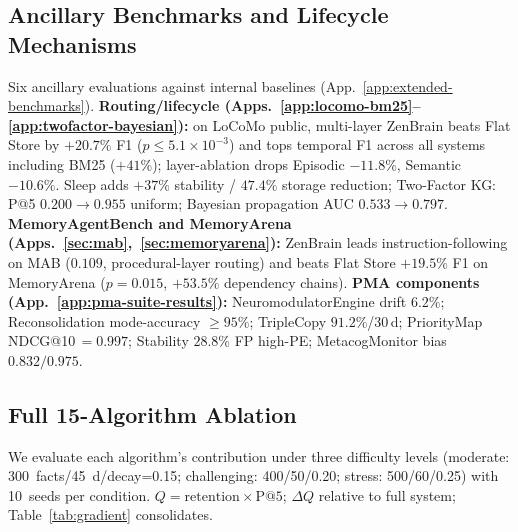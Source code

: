 \documentclass{article}
\begin{document}
\subsection{Ancillary Benchmarks and Lifecycle Mechanisms}
\label{sec:ancillary}

Six ancillary evaluations against internal baselines
(App.~\ref{app:extended-benchmarks}).
\textbf{Routing/lifecycle (Apps.~\ref{app:locomo-bm25}--\ref{app:twofactor-bayesian}):}
on LoCoMo public, multi-layer ZenBrain beats Flat Store by $+20.7\%$
F1 ($p \le 5.1\times 10^{-3}$) and tops temporal F1 across all systems including
BM25 ($+41\%$); layer-ablation drops Episodic $-11.8\%$, Semantic
$-10.6\%$. Sleep adds $+37\%$ stability / $47.4\%$ storage reduction;
Two-Factor KG: P@5 $0.200{\to}0.955$ uniform; Bayesian propagation
AUC $0.533{\to}0.797$.
\textbf{MemoryAgentBench and MemoryArena (Apps.~\ref{sec:mab},~\ref{sec:memoryarena}):}
ZenBrain leads instruction-following on MAB ($0.109$, procedural-layer
routing) and beats Flat Store $+19.5\%$ F1 on MemoryArena
($p{=}0.015$, $+53.5\%$ dependency chains).
\textbf{PMA components (App.~\ref{app:pma-suite-results}):}
NeuromodulatorEngine drift $6.2\%$; Reconsolidation mode-accuracy
$\geq 95\%$; TripleCopy $91.2\%$/30\,d; PriorityMap NDCG@10\,$=0.997$;
Stability $28.8\%$ FP high-PE; MetacogMonitor bias $0.832/0.975$.

\subsection{Full 15-Algorithm Ablation}
\label{sec:full-ablation}

We evaluate each algorithm's contribution under three difficulty levels
(moderate: 300~facts/45~d/decay=0.15; challenging: 400/50/0.20;
stress: 500/60/0.25) with 10~seeds per condition. $Q{=}\text{retention}{\times}\text{P@5}$;
$\Delta Q$ relative to full system; Table~\ref{tab:gradient} consolidates.
\end{document}
